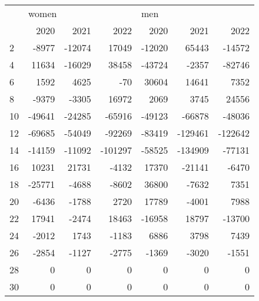 \begin{tabular}{lrrrrrr}
\toprule
{} & \multicolumn{3}{l}{women} & \multicolumn{3}{l}{men} \\
{} &   2020 &   2021 &    2022 &   2020 &    2021 &    2022 \\
\midrule
2  &  -8977 & -12074 &   17049 & -12020 &   65443 &  -14572 \\
4  &  11634 & -16029 &   38458 & -43724 &   -2357 &  -82746 \\
6  &   1592 &   4625 &     -70 &  30604 &   14641 &    7352 \\
8  &  -9379 &  -3305 &   16972 &   2069 &    3745 &   24556 \\
10 & -49641 & -24285 &  -65916 & -49123 &  -66878 &  -48036 \\
12 & -69685 & -54049 &  -92269 & -83419 & -129461 & -122642 \\
14 & -14159 & -11092 & -101297 & -58525 & -134909 &  -77131 \\
16 &  10231 &  21731 &   -4132 &  17370 &  -21141 &   -6470 \\
18 & -25771 &  -4688 &   -8602 &  36800 &   -7632 &    7351 \\
20 &  -6436 &  -1788 &    2720 &  17789 &   -4001 &    7988 \\
22 &  17941 &  -2474 &   18463 & -16958 &   18797 &  -13700 \\
24 &  -2012 &   1743 &   -1183 &   6886 &    3798 &    7439 \\
26 &  -2854 &  -1127 &   -2775 &  -1369 &   -3020 &   -1551 \\
28 &      0 &      0 &       0 &      0 &       0 &       0 \\
30 &      0 &      0 &       0 &      0 &       0 &       0 \\
\bottomrule
\end{tabular}
